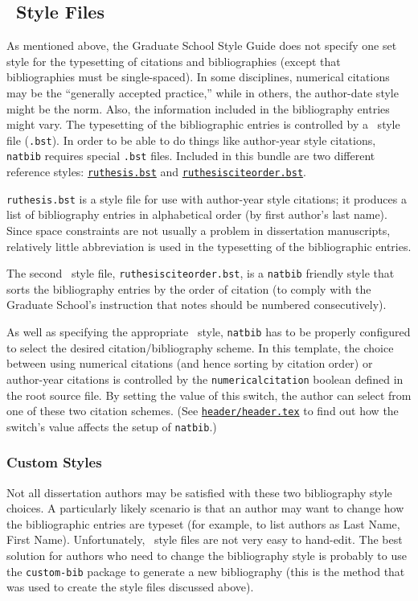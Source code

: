 \subsection{\BibTeX\ Style Files}
\label{sec:templateStructure:natbib:bst}%
As mentioned above, the Graduate School Style Guide does not specify one set style for the typesetting of citations and bibliographies (except that bibliographies must be single-spaced).
In some disciplines, numerical citations may be the ``generally accepted practice,'' while in others, the author-date style might be the norm.
Also, the information included in the bibliography entries might vary.
The typesetting of the bibliographic entries is controlled by a \BibTeX\ style file (\texttt{.bst}).
In order to be able to do things like author-year style citations, \texttt{natbib} requires special \texttt{.bst} files.
Included in this bundle are two different reference styles: \href{../bibtexery/ruthesis.bst}{\texttt{ruthesis.bst}} and \href{../bibtexery/ruthesisciteorder.bst}{\texttt{ruthesisciteorder.bst}}.

\texttt{ruthesis.bst} is a style file for use with author-year style citations; it produces a list of bibliography entries in alphabetical order (by first author's last name).
Since space constraints are not usually a problem in dissertation manu\-scripts, relatively little abbreviation is used in the typesetting of the bibliographic entries.

The second \BibTeX\ style file, \texttt{ruthesisciteorder.bst}, is a \texttt{natbib} friendly style that sorts the bibliography entries by the order of citation (to comply with the Graduate School's instruction that notes should be numbered consecutively).

As well as specifying the appropriate \BibTeX\ style, \texttt{natbib} has to be properly configured to select the desired citation/bibliography scheme.
In this template, the choice between using numerical citations (and hence sorting by citation order) or author-year citations is controlled by the \texttt{numericalcitation} boolean defined in the root source file.
By setting the value of this switch, the author can select from one of these two citation schemes.
(See \href{./header/header.tex}{\texttt{header/head\-er.tex}} to find out how the switch's value affects the setup of \texttt{natbib}.)

\subsubsection{Custom Styles}
Not all dissertation authors may be satisfied with these two bibliography style choices.
A particularly likely scenario is that an author may want to change how the bibliographic entries are typeset (for example, to list authors as Last Name, First Name).
Unfortunately, \BibTeX\ style files are not very easy to hand-edit.
The best solution for authors who need to change the bibliography style is probably to use the \texttt{custom-bib} package to generate a new bibliography (this is the method that was used to create the style files discussed above).


